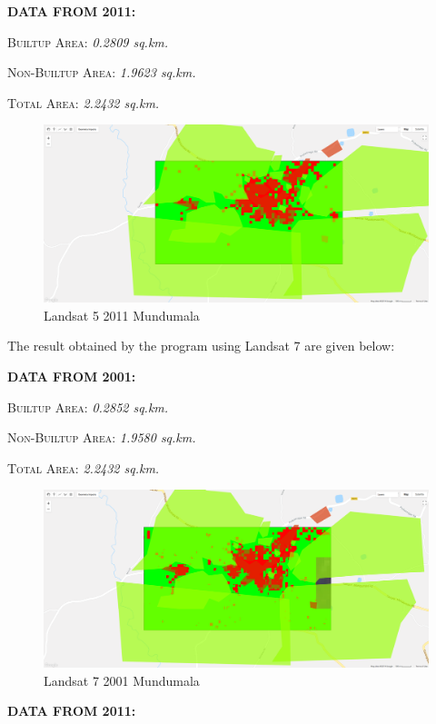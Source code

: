 \documentclass{article}
\begin{document}
\textbf{DATA FROM 2011:}

\textsc{Builtup Area: } \textit{0.2809 sq.km.}

\textsc{Non-Builtup Area: } \textit{1.9623 sq.km.}

\textsc{Total Area: } \textit{2.2432 sq.km.}

\begin{figure}[H]
\centering
\includegraphics[width=\textwidth]{2011_Mundumala}
\caption{Landsat 5 2011 Mundumala}
\end{figure}

\vfill

The result obtained by the program using \textsf{Landsat 7} are given below:

\textbf{DATA FROM 2001:}

\textsc{Builtup Area: } \textit{0.2852 sq.km.}

\textsc{Non-Builtup Area: } \textit{1.9580 sq.km.}

\textsc{Total Area: } \textit{2.2432 sq.km.}

\begin{figure}[H]
\centering
\includegraphics[width=\textwidth]{2001_Mundumala_L7}
\caption{Landsat 7 2001 Mundumala}
\end{figure}

\textbf{DATA FROM 2011:}
\end{document}
